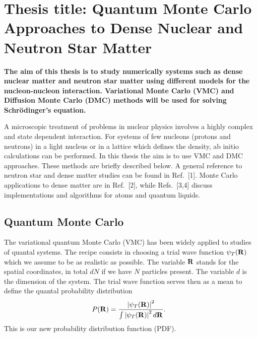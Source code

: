 \newcommand{\OP}[1]{{\bf\widehat{#1}}}

\newcommand{\be}{\begin{equation}}

\newcommand{\ee}{\end{equation}}
\newcommand{\bra}[1]{\left\langle #1 \right|}
\newcommand{\ket}[1]{\left| #1 \right\rangle}
\newcommand{\braket}[2]{\left\langle #1 \right| #2 \right\rangle}




\pagestyle{plain}

\section*{Thesis title:  Quantum Monte Carlo Approaches to Dense Nuclear and Neutron Star Matter }


{\bf The aim of this thesis is to study numerically systems such as 
dense nuclear matter and neutron star matter  using  different models for the nucleon-nucleon interaction.
Variational Monte Carlo (VMC) and 
Diffusion Monte Carlo (DMC) methods will be used for solving 
Schr\"odinger's equation. }

A microscopic treatment of 
problems in nuclear physics involves a highly complex and state dependent
interaction. For systems of few nucleons (protons and neutrons) in a light nucleus or in a lattice 
which defines the density, ab initio
calculations can be performed. In this thesis the aim is to use 
VMC and DMC approaches. These methods are briefly described below.
A general reference to neutron star and dense matter studies can be found in Ref.~[1].
Monte Carlo applications to dense matter are in Ref.~[2], while Refs.~[3,4] discuss implementations and 
algorithms for atoms and quantum liquids.
\subsection*{Quantum Monte Carlo}
The variational quantum Monte Carlo (VMC) has been widely applied 
to studies of quantal systems. 
The recipe consists in choosing 
a trial wave function
$\psi_T({\bf R})$ which we assume to be as realistic as possible. 
The variable ${\bf R}$ stands for the spatial coordinates, in total 
$dN$ if we have $N$ particles present. The variable $d$ is the dimension
of the system. 
The trial wave function serves then as
a mean to define the quantal probability distribution 
\be
   P({\bf R})= \frac{\left|\psi_T({\bf R})\right|^2}{\int \left|\psi_T({\bf R})\right|^2d{\bf R}}.
\ee
This is our new probability distribution function  (PDF). 

